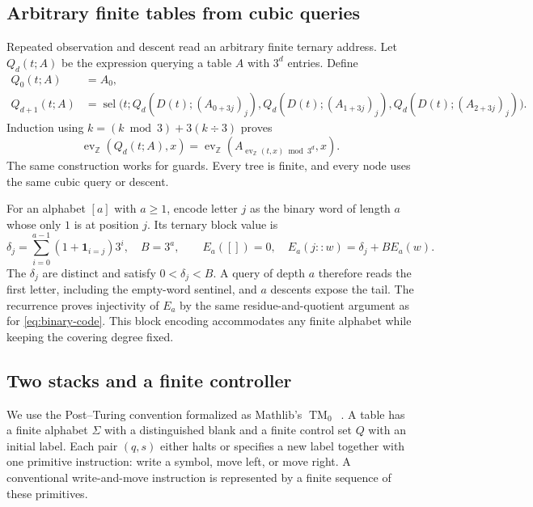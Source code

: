 \documentclass[11pt]{article}
\numberwithin{equation}{section}
\theoremstyle{definition}
\theoremstyle{remark}
\newcommand{\Z}{\mathbb Z}
\newcommand{\ev}{\operatorname{ev}}
\newcommand{\Sel}{\operatorname{sel}}
\newcommand{\TM}{\operatorname{TM}}
\begin{document}
\subsection{Arbitrary finite tables from cubic queries}

Repeated observation and descent read an arbitrary finite ternary
address. Let $Q_d(t;A)$ be the expression querying a table $A$ with
$3^d$ entries. Define
\begin{align}
 Q_0(t;A)&=A_0,\nonumber\\
 Q_{d+1}(t;A)
   &=\Sel\bigl(t;
       Q_d(D(t);(A_{0+3j})_j),
       Q_d(D(t);(A_{1+3j})_j),
       Q_d(D(t);(A_{2+3j})_j)\bigr).
 \label{eq:query-tree}
\end{align}
Induction using $k=(k\bmod3)+3(k\div3)$ proves
\begin{equation}\label{eq:query-tree-exact}
 \ev_\Z(Q_d(t;A),x)
   =\ev_\Z(A_{\ev_\Z(t,x)\bmod3^d},x).
\end{equation}
The same construction works for guards. Every tree is finite, and every
node uses the same cubic query or descent.

For an alphabet $[a]$ with $a\geq1$, encode letter $j$ as the binary
word of length $a$ whose only $1$ is at position $j$. Its ternary block
value is
\begin{equation}\label{eq:block-code}
 \delta_j=\sum_{i=0}^{a-1}(1+\mathbf1_{i=j})3^i,
 \quad B=3^a,\qquad
 E_a([])=0,\quad E_a(j::w)=\delta_j+B E_a(w).
\end{equation}
The $\delta_j$ are distinct and satisfy $0<\delta_j<B$. A query of
depth $a$ therefore reads the first letter, including the empty-word
sentinel, and $a$ descents expose the tail. The recurrence proves
injectivity of $E_a$ by the same residue-and-quotient argument as for
\eqref{eq:binary-code}. This block encoding accommodates any finite
alphabet while keeping the covering degree fixed.

\subsection{Two stacks and a finite controller}

We use the Post--Turing convention formalized as Mathlib's
$\TM_0$~\cite{mathlibComputability}. A table has a finite alphabet
$\Sigma$ with a distinguished blank and a finite control set $Q$ with
an initial label. Each pair $(q,s)$ either halts or specifies a new
label together with one primitive instruction: write a symbol, move
left, or move right. A conventional write-and-move instruction is
represented by a finite sequence of these primitives.
\end{document}
